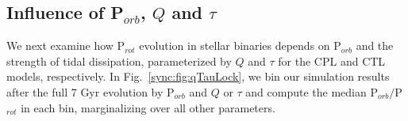 

\subsection{Influence of P$_{orb}$, $Q$ and $\tau$} \label{sync:sec:qTauMaps}

We next examine how P$_{rot}$ evolution in stellar binaries depends on P$_{orb}$ and the strength of tidal dissipation, parameterized by $Q$ and $\tau$ for the CPL and CTL models, respectively. In Fig.~\ref{sync:fig:qTauLock}, we bin our simulation results after the full 7 Gyr evolution by P$_{orb}$ and $Q$ or $\tau$ and compute the median P$_{orb}/$P$_{rot}$ in each bin, marginalizing over all other parameters.

